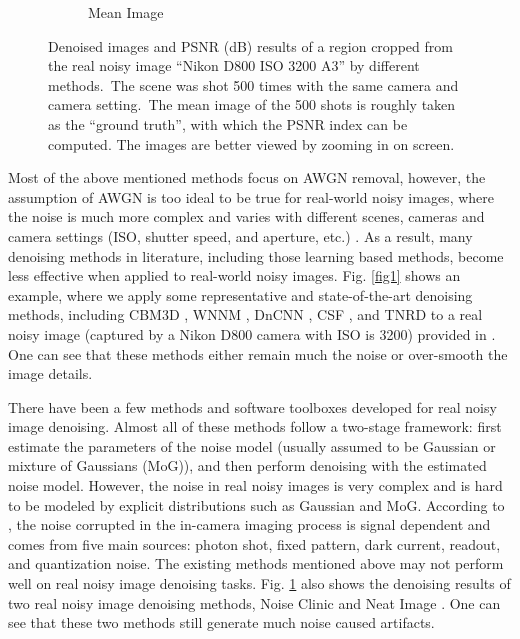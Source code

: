 \begin{figure}
\begin{subfigure}[t]{0.19\textwidth}
		\caption{Mean Image}
    \end{subfigure}
    \caption{Denoised images and PSNR (dB) results of a region cropped from the real noisy image ``Nikon D800 ISO 3200 A3'' \cite{crosschannel2016} by different methods.\ The scene was shot 500 times with the same camera and camera setting.\ The mean image of the 500 shots is roughly taken as the ``ground truth'', with which the PSNR index can be computed. The images are better viewed by zooming in on screen.}
    \label{fig3-1}
\end{figure}

Most of the above mentioned methods focus on AWGN removal, however, the assumption of AWGN is too ideal to be true for real-world noisy images, where the noise is much more complex and varies with different scenes, cameras and camera settings (ISO, shutter speed, and aperture, etc.) \cite{crosschannel2016,healey1994radiometric}. As a result, many denoising methods in literature, including those learning based methods, become less effective when applied to real-world noisy images. Fig. \ref{fig1} shows an example, where we apply some representative and state-of-the-art denoising methods, including CBM3D \cite{cbm3d}, WNNM \cite{wnnm}, DnCNN \cite{dncnn}, CSF \cite{csf}, and TNRD \cite{chen2015learning} to a real noisy image (captured by a Nikon D800 camera with ISO is 3200) provided in \cite{crosschannel2016}. One can see that these methods either remain much the noise or over-smooth the image details.

There have been a few methods \cite{fullyblind,rabie2005robust,Liu2008,almapg,crosschannel2016,Zhu_2016_CVPR,noiseclinic,ncwebsite} and software toolboxes \cite{neatimage} developed for real noisy image denoising. Almost all of these methods follow a two-stage framework: first estimate the parameters of the noise model (usually assumed to be Gaussian or mixture of Gaussians (MoG)), and then perform denoising with the estimated noise model. However, the noise in real noisy images is very complex and is hard to be modeled by explicit distributions such as Gaussian and MoG. According to \cite{healey1994radiometric}, the noise corrupted in the in-camera imaging process \cite{tsin2001statistical,NewInCamera,crosschannel2016,karaimer_brown_ECCV_2016} is signal dependent and comes from five main sources: photon shot, fixed pattern, dark current, readout, and quantization noise. The existing methods \cite{fullyblind,rabie2005robust,Liu2008,almapg,crosschannel2016,Zhu_2016_CVPR,noiseclinic,
ncwebsite,neatimage} mentioned above may not perform well on real noisy image denoising tasks. Fig. \ref{fig3-1} also shows the denoising results of two real noisy image denoising methods, Noise Clinic \cite{noiseclinic,ncwebsite} and Neat Image \cite{neatimage}. One can see that these two methods still generate much noise caused artifacts. 

